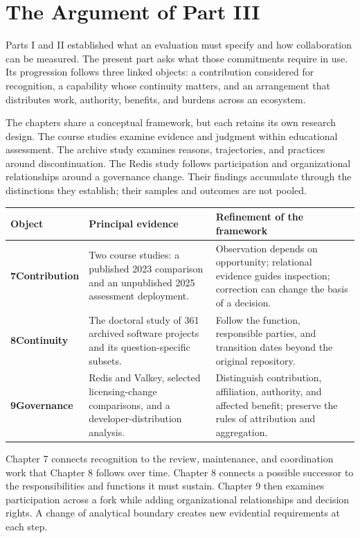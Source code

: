 \chapter*{The Argument of Part III}
\label{part3:guide}
\noindent Parts I and II established what an evaluation must specify and how collaboration can be measured. The present part asks what those commitments require in use. Its progression follows three linked objects: a contribution considered for recognition, a capability whose continuity matters, and an arrangement that distributes work, authority, benefits, and burdens across an ecosystem.

The chapters share a conceptual framework, but each retains its own research design. The course studies examine evidence and judgment within educational assessment. The archive study examines reasons, trajectories, and practices around discontinuation. The Redis study follows participation and organizational relationships around a governance change. Their findings accumulate through the distinctions they establish; their samples and outcomes are not pooled.

\vspace{4pt}
\begingroup\small
\renewcommand{\arraystretch}{1.16}
\noindent\begin{tabularx}{\linewidth}{@{}>{\raggedright\arraybackslash}p{30mm}>{\raggedright\arraybackslash}X >{\raggedright\arraybackslash}X@{}}
\toprule
\textbf{Object} & \textbf{Principal evidence} & \textbf{Refinement of the framework}\\
\midrule
\textbf{7\quad Contribution} & Two course studies: a published 2023 comparison and an unpublished 2025 assessment deployment. & Observation depends on opportunity; relational evidence guides inspection; correction can change the basis of a decision.\\[5pt]
\textbf{8\quad Continuity} & The doctoral study of 361 archived software projects and its question-specific subsets. & Follow the function, responsible parties, and transition dates beyond the original repository.\\[5pt]
\textbf{9\quad Governance} & Redis and Valkey, selected licensing-change comparisons, and a developer-distribution analysis. & Distinguish contribution, affiliation, authority, and affected benefit; preserve the rules of attribution and aggregation.\\
\bottomrule
\end{tabularx}
\endgroup
\par\vspace{9pt}
Chapter 7 connects recognition to the review, maintenance, and coordination work that Chapter 8 follows over time. Chapter 8 connects a possible successor to the responsibilities and functions it must sustain. Chapter 9 then examines participation across a fork while adding organizational relationships and decision rights. A change of analytical boundary creates new evidential requirements at each step.

